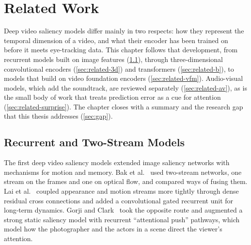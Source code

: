 \chapter{Related Work}\label{ch:related}


Deep video saliency models differ mainly in two respects: how they represent
the temporal dimension of a video, and what their encoder has been trained on
before it meets eye-tracking data. This chapter follows that development, from
recurrent models built on image features (\cref{sec:related-a}), through
three-dimensional convolutional encoders (\cref{sec:related-3d}) and
transformers (\cref{sec:related-b}), to models that build on video foundation
encoders (\cref{sec:related-vfm}). Audio-visual models, which add the
soundtrack, are reviewed separately (\cref{sec:related-av}), as is the small
body of work that treats prediction error as a cue for attention
(\cref{sec:related-surprise}). The chapter closes with a summary and the research
gap that this thesis addresses (\cref{sec:gap}).

\section{Recurrent and Two-Stream Models}\label{sec:related-a}

The first deep video saliency models extended image saliency networks with
mechanisms for motion and memory. Bak et al.~\cite{bak2018spatio} used
two-stream networks, one stream on the frames and one on optical flow, and
compared ways of fusing them. Lai et al.~\cite{lai2020video} coupled appearance
and motion streams more tightly through dense residual cross connections and
added a convolutional gated recurrent unit for long-term dynamics. Gorji and
Clark~\cite{gorji2018going} took the opposite route and augmented a strong
static saliency model with recurrent \enquote{attentional push} pathways, which
model how the photographer and the actors in a scene direct the viewer's
attention.

